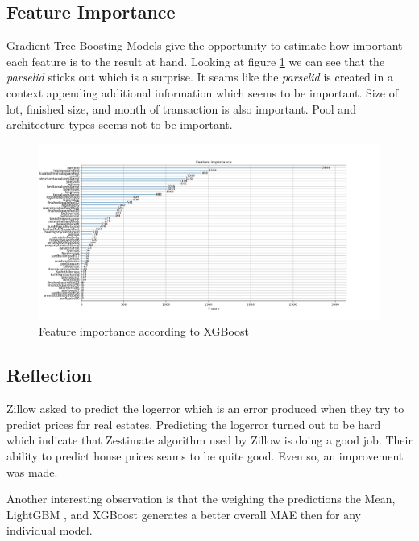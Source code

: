 \documentclass[a4paper]{article}
\begin{document}
\subsection{Feature Importance}
Gradient Tree Boosting Models give the opportunity to estimate how important each feature is to the result at hand. Looking at figure \ref{fig:feature-importance} we can see that the \textit{parselid} sticks out which is a surprise. It seams like the \textit{parselid} is created in a context appending additional information which seems to be important. Size of lot, finished size, and month of transaction is also important. Pool and architecture types seems not to be important.
\begin{figure}
	\centering
	\includegraphics[width=1.1\textwidth]{./img/feature-importance.png}
	\caption{\label{fig:feature-importance} Feature importance according to XGBoost }
\end{figure}


\subsection{Reflection}
Zillow asked to predict the logerror which is an error produced when they try to predict prices for real estates. Predicting the logerror turned out to be hard which indicate that Zestimate algorithm used by Zillow is doing a good job. Their ability to predict house prices seams to be quite good. Even so, an improvement was made.

Another interesting observation is that the weighing the predictions the Mean, LightGBM \cite{lightgbm}, and XGBoost \cite{xgboost} generates a better overall MAE then for any individual model.
\end{document}
